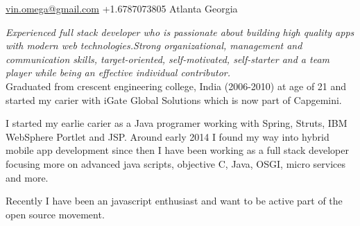 \documentclass[10pt,a4paper]{article}
\begin{document}
\sloppy  %



\nobreakvspace{0.3em}  %

\noindent\href{mailto:vin.omega@gmail.com}{vin.omega\mbox{}@\mbox{}gmail.com}\sbull
\textsmaller
{+}1.6787073805\sbull
Atlanta\sbull
Georgia

\spacedhrule{0.9em}{-0.4em}  %


\vspace{-1.3em}  %
\begin{multicols}{2}  %
\noindent \emph{Experienced full stack developer who is passionate about building high quality apps with modern web technologies.Strong organizational, management and communication skills, target-oriented, self-motivated, self-starter and a team player while being an effective individual contributor.}
\\

Graduated from crescent engineering college, India (2006-2010) at age of 21 and started my carier with iGate Global Solutions which is now part of Capgemini.

I started my earlie carier as a Java programer working with Spring, Struts, IBM WebSphere Portlet and JSP. Around early 2014 I found my way into hybrid mobile app development since then I have been working as a full stack developer focusing more on advanced java scripts, objective C, Java, OSGI, micro services and more.

Recently I have been an javascript enthusiast and want to be active part of the open source movement. 
\end{multicols}


\spacedhrule{0em}{-0.4em}

\end{document}
